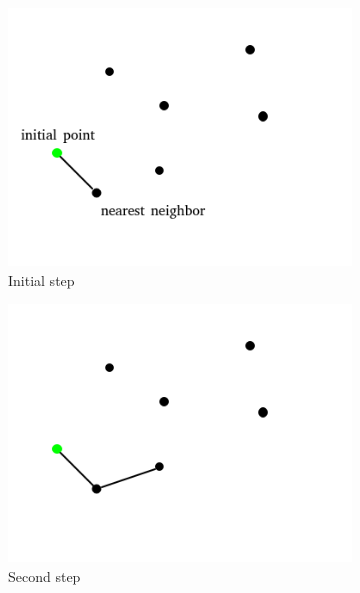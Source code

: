 \begin{figure}[h!]
  \centering
  \begin{subfigure}[b]{0.4\linewidth}
    \includegraphics[width=\linewidth]{media/neighbor1.png}
     \caption{Initial step}
  \end{subfigure}
  \begin{subfigure}[b]{0.4\linewidth}
    \includegraphics[width=\linewidth]{media/neighbor2.png}
    \caption{Second step}
  \end{subfigure}
  \begin{subfigure}[b]{0.4\linewidth}

\end{subfigure}
\end{figure}

